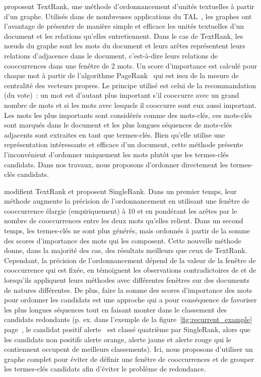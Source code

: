      proposent TextRank, une méthode
    d'ordonnancement d'unités textuelles à partir d'un graphe. Utilisés dans de
    nombreuses applications du TAL~\cite{kozareva2013textgraphs}, les graphes
    ont l'avantage de présenter de manière simple et efficace les unités
    textuelles d'un document et les relations qu'elles entretiennent. Dans le
    cas de TextRank, les n\oe{}uds du graphe sont les mots du document et leurs
    arêtes représentent leurs relations d'adjacence dans le document,
    c'est-à-dire leurs relations de cooccurrences dans une fenêtre de 2 mots. Un
    score d'importance est calculé pour chaque mot à partir de l'algorithme
    PageRank~\cite{brin1998pagerank} qui est issu de la mesure de centralité des
    vecteurs propres. Le principe utilisé est celui de la recommandation (du
    vote)~: un mot est d'autant plus important s'il cooccurre avec un grand
    nombre de mots et si les mots avec lesquels il cooccurre sont eux aussi
    important. Les mots les plus importants sont considérés comme des mots-clés,
    ces mots-clés sont marqués dans le document et les plus longues séquences de
    mots-clés adjacents sont extraites en tant que termes-clés. Bien qu'elle
    utilise une représentation intéressante et efficace d'un document, cette
    méthode présente l'inconvénient d'ordonner uniquement les mots plutôt que
    les termes-clés candidats. Dans nos travaux, nous proposons d'ordonner
    directement les termes-clés candidats.

     modifient TextRank et proposent SingleRank. Dans
    un premier temps, leur méthode augmente la précision de l'ordonnancement en
    utilisant une fenêtre de cooccurrence élargie (empiriquement) à 10 et en
    pondérant les arêtes par le nombre de cooccurrences entre les deux mots
    qu'elles relient. Dans un second temps, les termes-clés ne sont plus
    générés, mais ordonnés à partir de la somme des scores d'importance des mots
    qui les composent. Cette nouvelle méthode donne, dans la majorité des cas,
    des résultats meilleurs que ceux de TextRank. Cependant, la précision de
    l'ordonnancement dépend de la valeur de la fenêtre de cooccurrence qui est
    fixée, en témoignent les observations contradictoires de
     et de  lorsqu'ils
    appliquent leurs méthodes avec différentes fenêtres sur des documents de
    natures différentes. De plus, faire la somme des scores d'importance des
    mots pour ordonner les candidats est une approche qui a pour conséquence de
    favoriser les plus longues séquences tout en faisant monter dans le
    classement des candidats redondants (p. ex. dans l'exemple de la
    figure~\ref{fig:recurrent_example} page~\pageref{fig:recurrent_example}, le
    candidat positif \og{}alerte~\fg{} est classé quatrième par SingleRank,
    alors que les candidats non positifs \og{}alerte orange\fg{}, \og{}alerte
    jaune\fg{} et \og{}alerte rouge\fg{} qui le contiennent occupent de
    meilleurs classements). Ici, nous proposons d'utiliser un graphe complet
    pour éviter de définir une fenêtre de cooccurrences et de grouper les
    termes-clés candidats afin d'éviter le problème de redondance.

